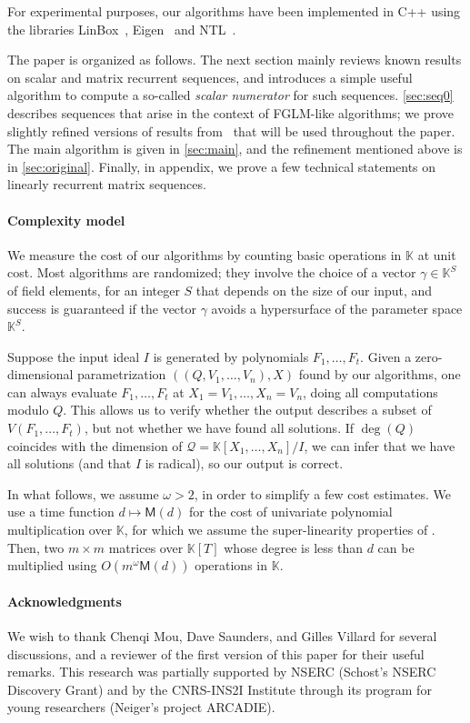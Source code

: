 \documentclass[final,1p,times,authoryear]{elsarticle}
\newcommand{\lf}{X}
\newcommand{\residueI}{\mathscr{Q}}
\newcommand{\sqfree}{Q}
\def\M {\ensuremath{\mathsf{M}}}
\def\K{\mathbb{K}}
\def\K {\ensuremath{\mathbb{K}}}
\begin{document}
For experimental purposes, our algorithms have been implemented in C++ using
the libraries LinBox~\citep{LinBox}, Eigen~\citep{Eigen} and NTL~\citep{NTL}.

The paper is organized as follows. The next section mainly reviews
known results on scalar and matrix recurrent sequences, and introduces
a simple useful algorithm to compute a so-called {\em scalar
  numerator} for such sequences. \cref{sec:seq0} describes sequences
that arise in the context of FGLM-like algorithms; we prove slightly
refined versions of results from~\citep{BoSaSc03} that will be used
throughout the paper. The main algorithm is given in \cref{sec:main},
and the refinement mentioned above is in \cref{sec:original}.
Finally, in appendix, we prove a few technical statements on linearly
recurrent matrix sequences.

\paragraph{Complexity model}
We measure the cost of our algorithms by counting basic operations in
$\K$ at unit cost. Most algorithms are randomized; they involve the
choice of a vector $\gamma \in \K^S$ of field elements, for an integer
$S$ that depends on the size of our input, and success is guaranteed
if the vector $\gamma$ avoids a hypersurface of the parameter space
$\K^S$.

Suppose the input ideal $I$ is generated by polynomials
$F_1,\dots,F_t$.  Given a zero-dimensional parametrization
$((\sqfree,V_1,\dots,V_n),\lf)$ found by our algorithms, one can
always evaluate $F_1,\dots,F_t$ at $X_1 =V_1,\dots,X_n=V_n$, doing all
computations modulo $\sqfree$. This allows us to verify whether the
output describes a subset of $V(F_1,\dots,F_t)$, but not whether we
have found all solutions.  If $\deg(Q)$ coincides with the dimension
of $\residueI=\K[X_1,\dots,X_n]/I$, we can infer that we have all
solutions (and that $I$ is radical), so our output is correct.

In what follows, we assume $\omega>2$, in order to simplify a few cost
estimates. We use a time function $d \mapsto \M(d)$ for the cost of
univariate polynomial multiplication over $\K$, for which we assume
the super-linearity properties of \citep[Section~8.4]{GaGe13}.  Then,
two $m\times m$ matrices over $\K[T]$ whose degree is less than $d$
can be multiplied using $O(m^\omega \M(d))$ operations in $\K$.

\paragraph{Acknowledgments} We wish to thank Chenqi Mou, Dave Saunders, and
Gilles Villard for several discussions, and a reviewer of the first
version of this paper for their useful remarks. This research was
partially supported by NSERC (Schost's NSERC Discovery Grant) and by
the CNRS-INS2I Institute through its program for young researchers
(Neiger's project ARCADIE).
\end{document}
